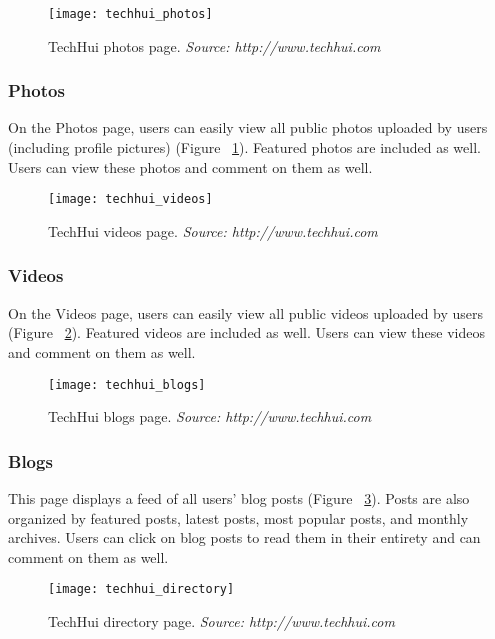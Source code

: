\begin{figure}[h]
\centering
\texttt{[image: techhui\_photos]}
\caption{TechHui photos page. \textit{Source: http://www.techhui.com}}
\label{techhui-photos}
\end{figure}

\subsubsection{Photos}

On the Photos page, users can easily view all public photos uploaded by users (including profile pictures) (Figure ~\ref{techhui-photos}). Featured photos are included as well. Users can view these photos and comment on them as well. 

\begin{figure}[h]
\centering
\texttt{[image: techhui\_videos]}
\caption{TechHui videos page. \textit{Source: http://www.techhui.com}}
\label{techhui-videos}
\end{figure}

\subsubsection{Videos}

On the Videos page, users can easily view all public videos uploaded by users (Figure ~\ref{techhui-videos}). Featured videos are included as well. Users can view these videos and comment on them as well. 

\begin{figure}[h]
\centering
\texttt{[image: techhui\_blogs]}
\caption{TechHui blogs page. \textit{Source: http://www.techhui.com}}
\label{techhui-blogs}
\end{figure}

\subsubsection{Blogs}

This page displays a feed of all users' blog posts (Figure ~\ref{techhui-blogs}). Posts are also organized by featured posts, latest posts, most popular posts, and monthly archives. Users can click on blog posts to read them in their entirety and can comment on them as well. 

\begin{figure}[h]
\centering
\texttt{[image: techhui\_directory]}
\caption{TechHui directory page. \textit{Source: http://www.techhui.com}}
\label{techhui-directory}
\end{figure}

